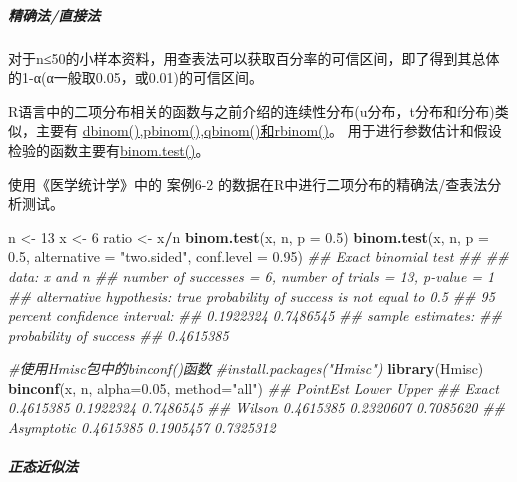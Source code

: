 \documentclass[
]{article}
\newenvironment{Shaded}{\begin{snugshade}}{\end{snugshade}}
\newcommand{\CommentTok}[1]{\textcolor[rgb]{0.56,0.35,0.01}{\textit{#1}}}
\newcommand{\DataTypeTok}[1]{\textcolor[rgb]{0.13,0.29,0.53}{#1}}
\newcommand{\DecValTok}[1]{\textcolor[rgb]{0.00,0.00,0.81}{#1}}
\newcommand{\FloatTok}[1]{\textcolor[rgb]{0.00,0.00,0.81}{#1}}
\newcommand{\KeywordTok}[1]{\textcolor[rgb]{0.13,0.29,0.53}{\textbf{#1}}}
\newcommand{\NormalTok}[1]{#1}
\newcommand{\OperatorTok}[1]{\textcolor[rgb]{0.81,0.36,0.00}{\textbf{#1}}}
\newcommand{\StringTok}[1]{\textcolor[rgb]{0.31,0.60,0.02}{#1}}
\begin{document}
\hypertarget{ux7cbeux786eux6cd5ux76f4ux63a5ux6cd5}{%
\subparagraph{精确法/直接法}\label{ux7cbeux786eux6cd5ux76f4ux63a5ux6cd5}}

对于n≤50的小样本资料，用查表法可以获取百分率的可信区间，即了得到其总体的1-α(α一般取0.05，或0.01)的可信区间。

R语言中的二项分布相关的函数与之前介绍的连续性分布(u分布，t分布和f分布)类似，主要有
\href{https://stat.ethz.ch/R-manual/R-devel/library/stats/html/Binomial.html}{dbinom(),pbinom(),qbinom()和rbinom()}。
用于进行参数估计和假设检验的函数主要有\href{https://stat.ethz.ch/R-manual/R-devel/library/stats/html/binom.test.html}{binom.test()}。

使用《医学统计学》中的 案例6-2 的数据在R中进行二项分布的精确法/查表法分析测试。

\begin{Shaded}
\begin{Highlighting}[]
\NormalTok{n <-}\StringTok{ }\DecValTok{13}
\NormalTok{x <-}\StringTok{ }\DecValTok{6}
\NormalTok{ratio <-}\StringTok{ }\NormalTok{x}\OperatorTok{/}\NormalTok{n}
\KeywordTok{binom.test}\NormalTok{(x, n, }\DataTypeTok{p =} \FloatTok{0.5}\NormalTok{)}
\KeywordTok{binom.test}\NormalTok{(x, n, }\DataTypeTok{p =} \FloatTok{0.5}\NormalTok{, }\DataTypeTok{alternative =} \StringTok{"two.sided"}\NormalTok{, }\DataTypeTok{conf.level =} \FloatTok{0.95}\NormalTok{)}
\CommentTok{##  Exact binomial test}
\CommentTok{## }
\CommentTok{## data:  x and n}
\CommentTok{## number of successes = 6, number of trials = 13, p-value = 1}
\CommentTok{## alternative hypothesis: true probability of success is not equal to 0.5}
\CommentTok{## 95 percent confidence interval:}
\CommentTok{##  0.1922324 0.7486545}
\CommentTok{## sample estimates:}
\CommentTok{## probability of success }
\CommentTok{##              0.4615385 }

\CommentTok{#使用Hmisc包中的binconf()函数}
\CommentTok{#install.packages("Hmisc")}
\KeywordTok{library}\NormalTok{(Hmisc)}
\KeywordTok{binconf}\NormalTok{(x, n, }\DataTypeTok{alpha=}\FloatTok{0.05}\NormalTok{, }\DataTypeTok{method=}\StringTok{"all"}\NormalTok{)}
\CommentTok{##             PointEst     Lower     Upper}
\CommentTok{## Exact      0.4615385 0.1922324 0.7486545}
\CommentTok{## Wilson     0.4615385 0.2320607 0.7085620}
\CommentTok{## Asymptotic 0.4615385 0.1905457 0.7325312}
\end{Highlighting}
\end{Shaded}

\hypertarget{ux6b63ux6001ux8fd1ux4f3cux6cd5}{%
\subparagraph{正态近似法}\label{ux6b63ux6001ux8fd1ux4f3cux6cd5}}
\end{document}
